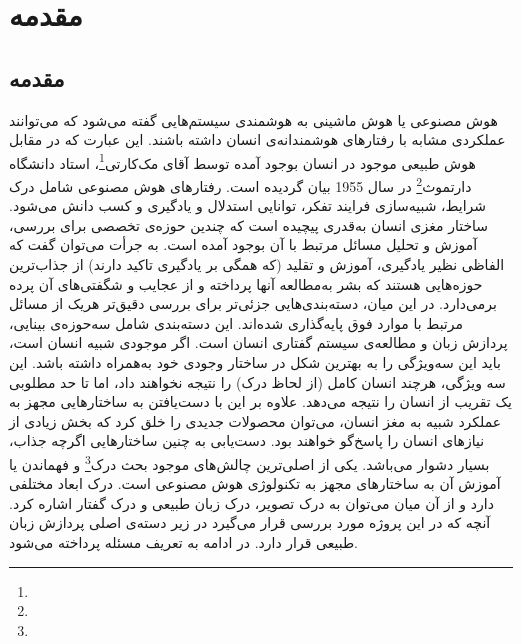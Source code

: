 \chapter{مقدمه}
\section{مقدمه}
هوش مصنوعی یا هوش ماشینی به هوشمندی سیستم‌هایی گفته می‌شود که می‌توانند عملکردی مشابه با رفتارهای هوشمندانه‌ی انسان داشته باشند. این عبارت که در مقابل هوش طبیعی موجود در انسان بوجود آمده توسط آقای مک‌کارتی\footnote{}، استاد دانشگاه دارتموث\footnote{} در سال 1955 بیان گردیده است. رفتارهای هوش مصنوعی شامل درک شرایط، شبیه‌سازی فرایند تفکر، توانایی استدلال و یادگیری و کسب دانش می‌شود.
ساختار مغزی انسان به‌قدری پیچیده است که چندین حوزه‌ی تخصصی برای بررسی، آموزش و تحلیل مسائل مرتبط با آن بوجود آمده است. به‌ جرأت می‌توان گفت که الفاظی نظیر یادگیری، آموزش و تقلید (که همگی بر یادگیری تاکید دارند) از جذاب‌ترین حوزه‌هایی هستند که بشر به‌مطالعه آنها پرداخته و از عجایب و شگفتی‌‌های آن پرده بر‌می‌دارد. در این میان،‌ دسته‌بندی‌هایی جزئی‌تر برای بررسی دقیق‌تر هر‌یک از مسائل مرتبط با موارد فوق ‌پایه‌گذاری شده‌اند. این دسته‌بندی شامل سه‌حوزه‌ی بینایی، پردازش زبان و مطالعه‌ی سیستم گفتاری انسان است. اگر موجودی شبیه‌ انسان است،‌ باید این سه‌ویژگی را به بهترین شکل در ساختار وجودی خود به‌همراه داشته باشد. این سه ویژگی، هرچند انسان کامل (از لحاظ درک) را نتیجه نخواهند داد، اما تا حد مطلوبی یک تقریب از انسان را نتیجه می‌دهد. علاوه بر این  با دست‌یافتن به ساختار‌هایی مجهز به عملکرد شبیه به مغز انسان، می‌توان محصولات جدیدی را خلق کرد که بخش زیادی از نیازهای انسان را پاسخ‌گو خواهند بود. دست‌یابی به چنین ساختار‌هایی اگرچه جذاب، بسیار دشوار می‌باشد. یکی از اصلی‌ترین چالش‌های موجود بحث درک\footnote{} و فهماندن یا آموزش آن به ساختار‌های مجهز به تکنولوژی هوش مصنوعی است. درک ابعاد مختلفی دارد و از آن میان می‌توان به درک تصویر، درک زبان طبیعی و درک گفتار اشاره کرد.
آنچه که در این پروژه مورد بررسی قرار می‌گیرد در زیر دسته‌ی اصلی پردازش زبان طبیعی قرار دارد. در ادامه به تعریف مسئله ‌پرداخته می‌شود.
